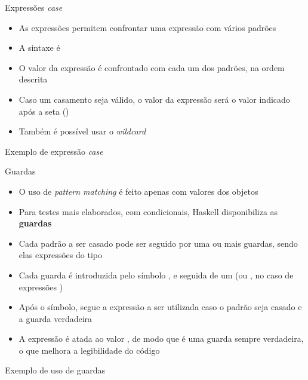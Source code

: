 \begin{frame}[fragile]{Expressões {\it case}}

    \begin{itemize}
        \item As expressões  permitem confrontar uma expressão com vários
            padrões

        \item A sintaxe é


        \item O valor da expressão é confrontado com cada um dos padrões, na ordem descrita

        \item Caso um casamento seja válido, o valor da expressão  será o
            valor indicado após a seta ()

        \item Também é possível usar o \textit{wildcard}
    \end{itemize}

\end{frame}

\begin{frame}[fragile]{Exemplo de expressão {\it case}}
\end{frame}

\begin{frame}[fragile]{Guardas}

    \begin{itemize}
        \item O uso de \textit{pattern matching} é feito apenas com valores dos objetos

        \item Para testes mais elaborados, com condicionais, Haskell disponibiliza as 
            \textbf{guardas}

        \item Cada padrão a ser casado pode ser seguido por uma ou mais guardas, sendo elas
            expressões do tipo 

        \item Cada guarda é introduzida pelo símbolo , e seguida de um
             (ou , no caso de expressões )

        \item Após o símbolo, segue a expressão a ser utilizada caso o padrão seja casado e a
            guarda verdadeira

        \item A expressão  é atada ao valor , de modo
            que é uma guarda sempre verdadeira, o que melhora a legibilidade do código
    \end{itemize}

\end{frame}

\begin{frame}[fragile]{Exemplo de uso de guardas}
\end{frame}
